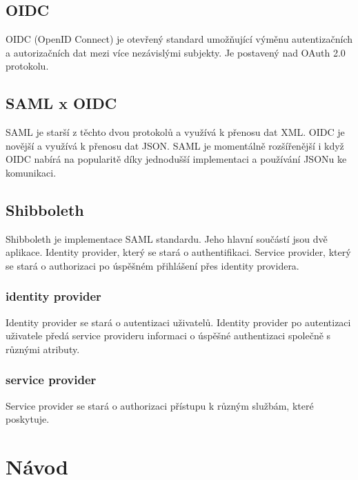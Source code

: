 \section{OIDC}

OIDC (OpenID Connect) je otevřený standard umožňující výměnu autentizačních a autorizačních dat mezi více nezávislými subjekty. Je postavený nad OAuth 2.0 protokolu.\cite{OIDC}

\section{SAML x OIDC}

SAML je starší z těchto dvou protokolů a využívá k přenosu dat XML. OIDC je novější a využívá k přenosu dat JSON. 
SAML je momentálně rozšířenější i když OIDC nabírá na popularitě díky jednodušší implementaci a používání JSONu ke komunikaci.\cite{SAMLxOIDC}

\section{Shibboleth}

Shibboleth je implementace SAML standardu. Jeho hlavní součástí jsou dvě aplikace. Identity provider, který se stará o authentifikaci. Service provider, který se stará o authorizaci po úspěšném přihlášení přes identity providera. \cite{shibbolethWiki}

\subsection{identity provider}

Identity provider se stará o autentizaci uživatelů. Identity provider po autentizaci uživatele předá service provideru informaci o úspěšné authentizaci společně s různými atributy.

\subsection{service provider}

Service provider se stará o authorizaci přístupu k různým službám, které poskytuje. 

\subsection{}

\chapter{Návod}
\label{návod}

